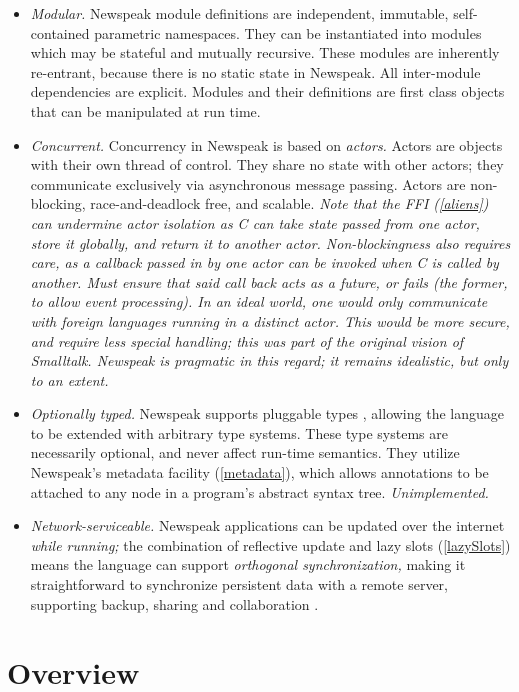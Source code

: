 \documentclass{article}
\begin{document}
\begin{itemize}
\item  {\em Modular.} Newspeak module definitions are independent, immutable, self-contained parametric namespaces.  They can be instantiated into modules which may be stateful and mutually recursive. These modules are inherently re-entrant, because there is no static state in Newspeak.  All inter-module dependencies are explicit. Modules and their definitions are first class objects that can be manipulated at run time.
\item  {\em Concurrent.}  Concurrency  in Newspeak is based on {\em actors.} Actors are objects with their own thread of control. They share no state with other actors; they communicate exclusively via asynchronous message passing. Actors are non-blocking, race-and-deadlock free, and scalable.
{\it Note that the FFI (\ref{aliens}) can undermine actor isolation as C can take state passed from one actor, store it globally, and return it to another actor. Non-blockingness also requires care, as a callback passed in by one actor can be invoked when C is called by another. Must ensure that said call back acts as a future, or  fails (the former, to allow event processing). In an ideal world, one would only communicate with foreign languages running in a distinct actor. This would be more secure, and require less special handling; this was part of the original vision of Smalltalk.  Newspeak is pragmatic in this regard; it remains idealistic, but only to an extent.
}
\item  {\em Optionally typed.} Newspeak supports pluggable types \cite{bracha04b}, allowing the language to be extended with arbitrary type systems.  These type systems are necessarily optional, and never affect run-time semantics. They utilize Newspeak's metadata facility (\ref{metadata}), which allows annotations to be attached to any node in a program's abstract syntax tree.
{\it Unimplemented.}
\item  {\em Network-serviceable.} Newspeak applications can be updated over the internet {\em while running;} the combination of reflective update and lazy slots (\ref{lazySlots}) means the language can support {\em orthogonal synchronization, } making it straightforward to synchronize persistent data with a remote server, supporting backup, sharing and collaboration \cite{bracha05}.
\end{itemize}

\section{Overview}
\end{document}
